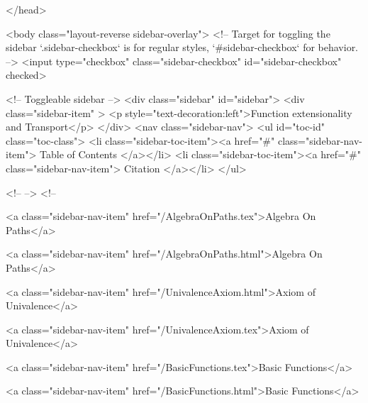   
</head>




  <body class="layout-reverse sidebar-overlay">
    <!-- Target for toggling the sidebar `.sidebar-checkbox` is for regular
     styles, `#sidebar-checkbox` for behavior. -->
<input type="checkbox" class="sidebar-checkbox" id="sidebar-checkbox" checked>

<!-- Toggleable sidebar -->
<div class="sidebar" id="sidebar">
  <div class="sidebar-item" >
    <p style="text-decoration:left">Function extensionality and Transport</p>
  </div>
  <nav class="sidebar-nav">
    <ul id="toc-id" class="toc-class">
  <li class="sidebar-toc-item"><a href="#" class="sidebar-nav-item"> Table of Contents </a></li>
  <li class="sidebar-toc-item"><a href="#" class="sidebar-nav-item"> Citation </a></li>
</ul>


    <!--  -->
    <!-- 
      
    
      
    
      
    
      
        
      
    
      
        
          <a class="sidebar-nav-item" href="/AlgebraOnPaths.tex">Algebra On Paths</a>
        
      
    
      
        
          <a class="sidebar-nav-item" href="/AlgebraOnPaths.html">Algebra On Paths</a>
        
      
    
      
        
          <a class="sidebar-nav-item" href="/UnivalenceAxiom.html">Axiom of Univalence</a>
        
      
    
      
        
          <a class="sidebar-nav-item" href="/UnivalenceAxiom.tex">Axiom of Univalence</a>
        
      
    
      
        
          <a class="sidebar-nav-item" href="/BasicFunctions.tex">Basic Functions</a>
        
      
    
      
        
          <a class="sidebar-nav-item" href="/BasicFunctions.html">Basic Functions</a>
        
      
    

